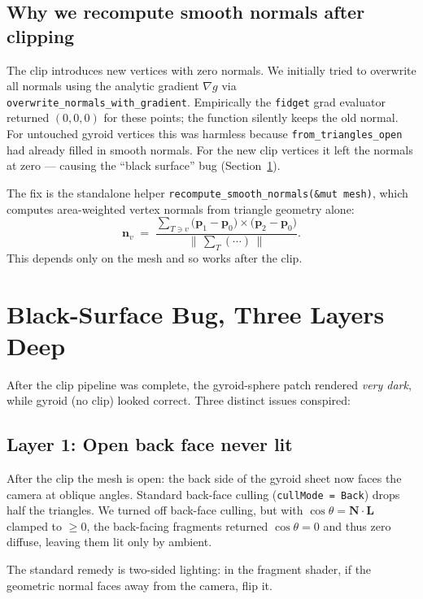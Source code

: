 \documentclass[11pt]{article}
\begin{document}
\subsection{Why we recompute smooth normals after clipping}

The clip introduces new vertices with zero normals.  We initially tried
to overwrite all normals using the analytic gradient $\nabla g$ via
\texttt{overwrite\_normals\_with\_gradient}.  Empirically the
\texttt{fidget} grad evaluator returned $(0,0,0)$ for these points; the
function silently keeps the old normal.  For untouched gyroid vertices
this was harmless because \texttt{from\_triangles\_open} had already
filled in smooth normals.  For the new clip vertices it left the
normals at zero --- causing the ``black surface'' bug
(Section~\ref{sec:black}).

The fix is the standalone helper
\texttt{recompute\_smooth\_normals(\&mut mesh)}, which computes
area-weighted vertex normals from triangle geometry alone:
\[
  \mathbf{n}_v
  \;=\;
  \frac{
    \displaystyle\sum_{T \ni v}\bigl(\mathbf{p}_1-\mathbf{p}_0\bigr)\times
                                  \bigl(\mathbf{p}_2-\mathbf{p}_0\bigr)
  }{
    \bigl\|\,\sum_T (\cdots)\,\bigr\|
  }.
\]
This depends only on the mesh and so works after the clip.

\section{Black-Surface Bug, Three Layers Deep}\label{sec:black}

After the clip pipeline was complete, the gyroid-sphere patch rendered
\emph{very dark}, while gyroid (no clip) looked correct.  Three
distinct issues conspired:

\subsection{Layer 1: Open back face never lit}

After the clip the mesh is open: the back side of the gyroid sheet now
faces the camera at oblique angles.  Standard back-face culling
(\texttt{cullMode = Back}) drops half the triangles.  We turned off
back-face culling, but with $\cos\theta = \mathbf{N}\cdot\mathbf{L}$
clamped to $\ge 0$, the back-facing fragments returned $\cos\theta=0$
and thus zero diffuse, leaving them lit only by ambient.

The standard remedy is two-sided lighting: in the fragment shader, if
the geometric normal faces away from the camera, flip it.
\end{document}
